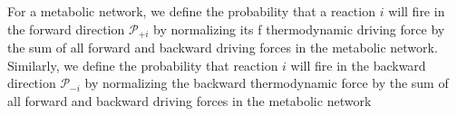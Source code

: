 For a metabolic network, we define the probability that a reaction $i$ will fire in the forward  direction ${\mathcal P_{+i}}$ by normalizing its f thermodynamic driving force by the sum of all forward and backward driving forces in the metabolic network. Similarly, we define the probability that reaction $i$ will fire in the backward direction $\mathcal P_{-i}$ by normalizing the backward thermodynamic force by  the sum of all forward and backward driving forces in the metabolic network